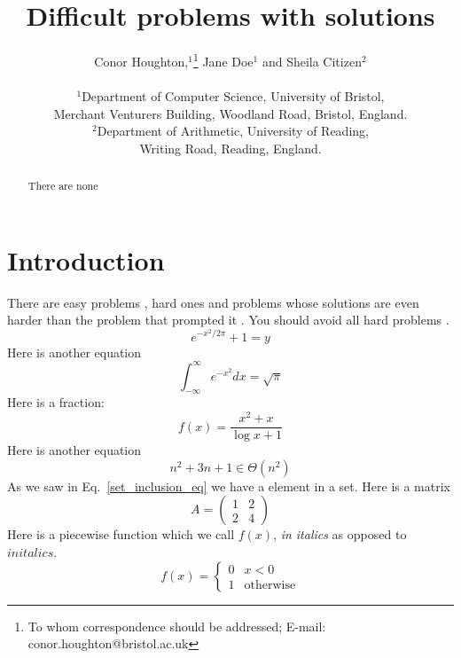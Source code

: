 



\title{Difficult problems with solutions} 

\author
{Conor Houghton,$^{1}$\footnote{To whom correspondence should be addressed; E-mail:  conor.houghton@bristol.ac.uk} Jane Doe$^{1}$ and Sheila Citizen$^{2}$\\
\\
\normalsize{$^{1}$Department of Computer Science, University of Bristol,}\\
\normalsize{Merchant Venturers Building, Woodland Road, Bristol, England.}\\
\normalsize{$^{2}$Department of Arithmetic, University of Reading,}\\
\normalsize{Writing Road, Reading, England.}\\
}

\date{}

\maketitle


\begin{abstract}
There are none
\end{abstract}


\section{Introduction}
There are easy problems \cite{BrainBrainBrain1902a}, hard ones \cite{LightKnight2007a} and problems whose solutions are even harder than the problem that prompted it \cite{Swift1729a}. You should avoid all hard problems \cite{LightKnight2007a,Swift1729a}.
\begin{equation}
e^{-x^2/2\pi}+1=y
\end{equation}
Here is another equation
\begin{equation}
\int_{-\infty}^\infty e^{-x^2}dx=\sqrt{\pi}
\end{equation}
Here is a fraction:
\begin{equation}
f(x)=\frac{x^2+x}{\log{x}+1}
\end{equation}
Here is another equation
\begin{equation}\label{set_inclusion_eq}
n^2+3n+1\in \Theta(n^2)
\end{equation}
As we saw in Eq.~\ref{set_inclusion_eq} we have a element in a set.
Here is a matrix
\begin{equation}
A=\left(\begin{array}{cc}1&2\\2&4\end{array}\right)
\end{equation}
Here is a piecewise function which we call $f(x)$, \textsl{in italics} as opposed to $in italics$.
\begin{equation}
f(x)=\left\{\begin{array}{cl}0&x<0\\1&\mbox{otherwise}\end{array}\right.
\end{equation}








